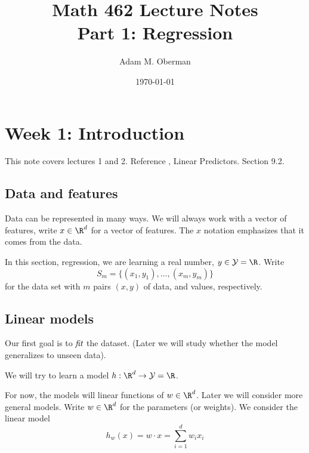 \documentclass[12pt]{amsart}
\begin{document}
 
\title{Math 462 Lecture Notes\\ Part 1: Regression}
\author{Adam M. Oberman}
\date{\today}
%

\maketitle

\tableofcontents



\section{Week 1: Introduction}
This note covers lectures 1 and 2. 
Reference \cite[Chapter 9]{shalev-shwartz_ben-david_2014}, Linear Predictors.  Section 9.2.

\subsection{Data and features}
Data can be represented in many ways.  We will always work with a vector of features, write $x\in \R^d$ for a vector of features.  The $x$ notation emphasizes that it comes from the data.  

In this section, regression, we are learning a real number,  $y \in \mathcal Y = \R$. 
Write 
\begin{equation}\label{dataset} \tag{$S_m$}
	S_m = \{(x_1, y_1), \dots, (x_m, y_m) \}
\end{equation}
for the data set with $m$ pairs $(x,y)$ of data, and values, respectively. 

\subsection{Linear models}
Our first goal is to $\emph{fit}$ the dataset.  (Later we will study whether the model generalizes to unseen data). 

We will try to learn a model $h : \R^d \to \mathcal Y = \R$.  

For now, the models will linear functions of $w \in \R^d$.  Later we will consider more general models. 
Write $w \in \R^d$ for the parameters (or weights).  We consider the linear model
\begin{equation}
	\label{linear.model}
	h_{w}(x) = w\cdot x = \sum_{i=1}^d w_i x_i
\end{equation}
\end{document}
